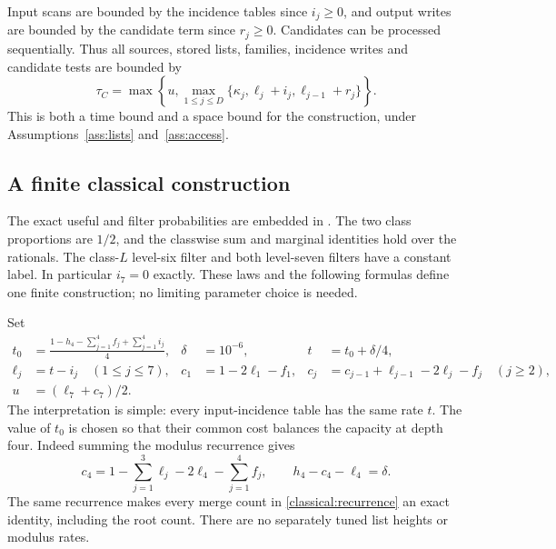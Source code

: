 \documentclass[10pt,a4paper]{article}
\theoremstyle{definition}
\begin{document}
Input scans are bounded by the incidence tables since $i_j\ge0$, and
output writes are bounded by the candidate term since $r_j\ge0$.
Candidates can be processed sequentially. Thus all sources, stored lists,
families, incidence writes and candidate tests are bounded by
\begin{equation}
 \tau_C=\max\left\{u,
       \max_{1\le j\le D}
          \{\kappa_j,\ell_j+i_j,\ell_{j-1}+r_j\}\right\}.
 \label{classical:cost}
\end{equation}
This is both a time bound and a space bound for the construction, under
Assumptions~\ref{ass:lists} and~\ref{ass:access}.

\subsection{A finite classical construction}
The exact useful and filter probabilities are embedded in
. The two class proportions are $1/2$, and the
classwise sum and marginal identities hold over the rationals. The
class-$L$ level-six filter and both level-seven filters have a constant
label. In particular $i_7=0$ exactly. These laws and the following formulas
define one finite construction; no limiting parameter choice is needed.

Set
\begin{align}
 t_0&=\frac{1-h_4-\sum_{j=1}^{4}f_j+
                         \sum_{j=1}^{4}i_j}{4},
 &\delta&=10^{-6},
 &t&=t_0+\delta/4,
 \label{classical:time-profile}\\
 \ell_j&=t-i_j\quad(1\le j\le7),
 &c_1&=1-2\ell_1-f_1,
 &c_j&=c_{j-1}+\ell_{j-1}-2\ell_j-f_j\quad(j\ge2),
 \label{classical:rates-profile}\\
 u&=(\ell_7+c_7)/2.
 \label{classical:source-profile}
\end{align}
The interpretation is simple: every input-incidence table has the same
rate $t$. The value of $t_0$ is chosen so that their common cost balances
the capacity at depth four. Indeed summing the modulus recurrence gives
\[
 c_4=1-\sum_{j=1}^{3}\ell_j-2\ell_4-\sum_{j=1}^{4}f_j,
 \qquad h_4-c_4-\ell_4=\delta.
\]
The same recurrence makes every merge count in
\eqref{classical:recurrence} an exact identity, including the root count.
There are no separately tuned list heights or modulus rates.
\end{document}
